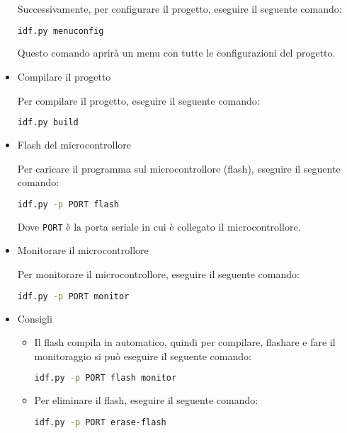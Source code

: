 \documentclass[a4paper]{article}
\begin{document}
\begin{itemize}
    Successivamente, per configurare il progetto, eseguire il seguente comando:

    \begin{lstlisting}[language=Bash]
idf.py menuconfig
\end{lstlisting}

    Questo comando aprirà un menu con tutte le configurazioni del progetto.

  \item Compilare il progetto

    \vspace{1em}
    \noindent
    Per compilare il progetto, eseguire il seguente comando:
\begin{lstlisting}[language=Bash]
idf.py build
\end{lstlisting}

  \item Flash del microcontrollore

    \vspace{1em}
    \noindent
    Per caricare il programma sul microcontrollore (flash), eseguire il seguente comando:

\begin{lstlisting}[language=Bash]
idf.py -p PORT flash
\end{lstlisting}

    Dove \lstinline{PORT} è la porta seriale in cui è collegato il microcontrollore.

  \item Monitorare il microcontrollore

    \vspace{1em}
    \noindent
    Per monitorare il microcontrollore, eseguire il seguente comando:

\begin{lstlisting}[language=Bash]
idf.py -p PORT monitor
\end{lstlisting}

  \item Consigli
    \begin{itemize}
      \item 
        Il flash compila in automatico, quindi per compilare, flashare e fare il monitoraggio
        si può eseguire il seguente comando:

\begin{lstlisting}[language=Bash]
idf.py -p PORT flash monitor
\end{lstlisting}

      \item Per eliminare il flash, eseguire il seguente comando:

\begin{lstlisting}[language=Bash]
idf.py -p PORT erase-flash
\end{lstlisting}

    \end{itemize}

\end{itemize}
\end{document}
